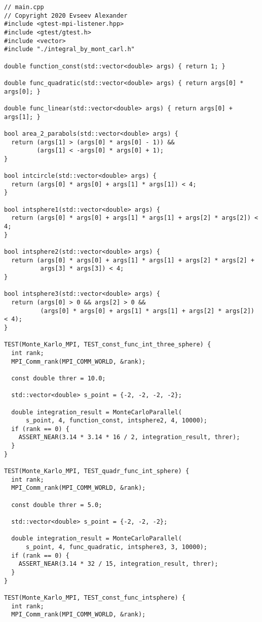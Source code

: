 \documentclass{report}
\begin{document}
\begin{lstlisting}
// main.cpp
// Copyright 2020 Evseev Alexander
#include <gtest-mpi-listener.hpp>
#include <gtest/gtest.h>
#include <vector>
#include "./integral_by_mont_carl.h"

double function_const(std::vector<double> args) { return 1; }

double func_quadratic(std::vector<double> args) { return args[0] * args[0]; }

double func_linear(std::vector<double> args) { return args[0] + args[1]; }

bool area_2_parabols(std::vector<double> args) {
  return (args[1] > (args[0] * args[0] - 1)) &&
         (args[1] < -args[0] * args[0] + 1);
}

bool intcircle(std::vector<double> args) {
  return (args[0] * args[0] + args[1] * args[1]) < 4;
}

bool intsphere1(std::vector<double> args) {
  return (args[0] * args[0] + args[1] * args[1] + args[2] * args[2]) < 4;
}

bool intsphere2(std::vector<double> args) {
  return (args[0] * args[0] + args[1] * args[1] + args[2] * args[2] +
          args[3] * args[3]) < 4;
}

bool intsphere3(std::vector<double> args) {
  return (args[0] > 0 && args[2] > 0 &&
          (args[0] * args[0] + args[1] * args[1] + args[2] * args[2]) < 4);
}

TEST(Monte_Karlo_MPI, TEST_const_func_int_three_sphere) {
  int rank;
  MPI_Comm_rank(MPI_COMM_WORLD, &rank);

  const double threr = 10.0;

  std::vector<double> s_point = {-2, -2, -2, -2};

  double integration_result = MonteCarloParallel(
      s_point, 4, function_const, intsphere2, 4, 10000);
  if (rank == 0) {
    ASSERT_NEAR(3.14 * 3.14 * 16 / 2, integration_result, threr);
  }
}

TEST(Monte_Karlo_MPI, TEST_quadr_func_int_sphere) {
  int rank;
  MPI_Comm_rank(MPI_COMM_WORLD, &rank);

  const double threr = 5.0;

  std::vector<double> s_point = {-2, -2, -2};

  double integration_result = MonteCarloParallel(
      s_point, 4, func_quadratic, intsphere3, 3, 10000);
  if (rank == 0) {
    ASSERT_NEAR(3.14 * 32 / 15, integration_result, threr);
  }
}

TEST(Monte_Karlo_MPI, TEST_const_func_intsphere) {
  int rank;
  MPI_Comm_rank(MPI_COMM_WORLD, &rank);


\end{lstlisting}
\end{document}
